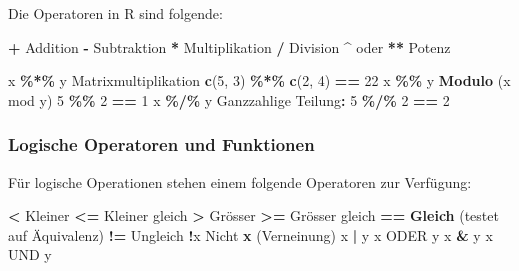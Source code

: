 \documentclass[
]{article}
\newenvironment{Shaded}{\begin{snugshade}}{\end{snugshade}}
\newcommand{\DecValTok}[1]{\textcolor[rgb]{0.00,0.00,0.81}{#1}}
\newcommand{\FunctionTok}[1]{\textcolor[rgb]{0.13,0.29,0.53}{\textbf{#1}}}
\newcommand{\NormalTok}[1]{#1}
\newcommand{\SpecialCharTok}[1]{\textcolor[rgb]{0.81,0.36,0.00}{\textbf{#1}}}
\begin{document}
Die Operatoren in R sind folgende:

\begin{Shaded}
\begin{Highlighting}[]
\SpecialCharTok{+}\NormalTok{               Addition}
\SpecialCharTok{{-}}\NormalTok{               Subtraktion}
\SpecialCharTok{*}\NormalTok{               Multiplikation}
\SpecialCharTok{/}\NormalTok{               Division}
\SpecialCharTok{\^{}}\NormalTok{ oder }\SpecialCharTok{**}\NormalTok{       Potenz}


\NormalTok{x }\SpecialCharTok{\%*\%}\NormalTok{ y         Matrixmultiplikation }\FunctionTok{c}\NormalTok{(}\DecValTok{5}\NormalTok{, }\DecValTok{3}\NormalTok{) }\SpecialCharTok{\%*\%} \FunctionTok{c}\NormalTok{(}\DecValTok{2}\NormalTok{, }\DecValTok{4}\NormalTok{) }\SpecialCharTok{==} \DecValTok{22}
\NormalTok{x }\SpecialCharTok{\%\%}\NormalTok{ y          }\FunctionTok{Modulo}\NormalTok{ (x mod y) }\DecValTok{5} \SpecialCharTok{\%\%} \DecValTok{2} \SpecialCharTok{==} \DecValTok{1}
\NormalTok{x }\SpecialCharTok{\%/\%}\NormalTok{ y         Ganzzahlige Teilung}\SpecialCharTok{:} \DecValTok{5} \SpecialCharTok{\%/\%} \DecValTok{2} \SpecialCharTok{==} \DecValTok{2}
\end{Highlighting}
\end{Shaded}

\hypertarget{logische-operatoren-und-funktionen}{%
\subsubsection{Logische Operatoren und
Funktionen}\label{logische-operatoren-und-funktionen}}

Für logische Operationen stehen einem folgende Operatoren zur Verfügung:

\begin{Shaded}
\begin{Highlighting}[]
\SpecialCharTok{\textless{}}\NormalTok{               Kleiner}
\SpecialCharTok{\textless{}=}\NormalTok{              Kleiner gleich}
\SpecialCharTok{\textgreater{}}\NormalTok{               Grösser}
\SpecialCharTok{\textgreater{}=}\NormalTok{              Grösser gleich}
\SpecialCharTok{==}              \FunctionTok{Gleich}\NormalTok{ (testet auf Äquivalenz)}
\SpecialCharTok{!=}\NormalTok{              Ungleich}
\SpecialCharTok{!}\NormalTok{x              Nicht }\FunctionTok{x}\NormalTok{ (Verneinung)}
\NormalTok{x }\SpecialCharTok{|}\NormalTok{ y           x ODER y}
\NormalTok{x }\SpecialCharTok{\&}\NormalTok{ y           x UND y}
\end{Highlighting}
\end{Shaded}
\end{document}
